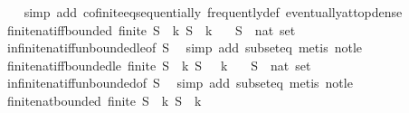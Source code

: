 \begin{isabellebody}
\ \ \isamarkupfalse%
\ {\isacharparenleft}simp\ add{\isacharcolon}\ cofinite{\isacharunderscore}eq{\isacharunderscore}sequentially\ frequently{\isacharunderscore}def\ eventually{\isacharunderscore}at{\isacharunderscore}top{\isacharunderscore}dense{\isacharparenright}%
\endisatagproof
{\isafoldproof}%
%
\isadelimproof
\isanewline
%
\endisadelimproof
\isanewline
{}\isamarkupfalse%
\ finite{\isacharunderscore}nat{\isacharunderscore}iff{\isacharunderscore}bounded{\isacharcolon}\ {\isachardoublequoteopen}finite\ S\ {\isasymlongleftrightarrow}\ {\isacharparenleft}{\isasymexists}k{\isachardot}\ S\ {\isasymsubseteq}\ {\isacharbraceleft}{\isachardot}{\isachardot}{\isacharless}k{\isacharbraceright}{\isacharparenright}{\isachardoublequoteclose}\isanewline
\ \ \ S\ {\isacharcolon}{\isacharcolon}\ {\isachardoublequoteopen}nat\ set{\isachardoublequoteclose}\isanewline
%
\isadelimproof
\ \ %
\endisadelimproof
%
\isatagproof
{}\isamarkupfalse%
\ infinite{\isacharunderscore}nat{\isacharunderscore}iff{\isacharunderscore}unbounded{\isacharunderscore}le{\isacharbrackleft}of\ S{\isacharbrackright}\ \isamarkupfalse%
\ {\isacharparenleft}simp\ add{\isacharcolon}\ subset{\isacharunderscore}eq{\isacharparenright}\ {\isacharparenleft}metis\ not{\isacharunderscore}le{\isacharparenright}%
\endisatagproof
{\isafoldproof}%
%
\isadelimproof
\isanewline
%
\endisadelimproof
\isanewline
{}\isamarkupfalse%
\ finite{\isacharunderscore}nat{\isacharunderscore}iff{\isacharunderscore}bounded{\isacharunderscore}le{\isacharcolon}\ {\isachardoublequoteopen}finite\ S\ {\isasymlongleftrightarrow}\ {\isacharparenleft}{\isasymexists}k{\isachardot}\ S\ {\isasymsubseteq}\ {\isacharbraceleft}{\isachardot}{\isachardot}\ k{\isacharbraceright}{\isacharparenright}{\isachardoublequoteclose}\isanewline
\ \ \ S\ {\isacharcolon}{\isacharcolon}\ {\isachardoublequoteopen}nat\ set{\isachardoublequoteclose}\isanewline
%
\isadelimproof
\ \ %
\endisadelimproof
%
\isatagproof
{}\isamarkupfalse%
\ infinite{\isacharunderscore}nat{\isacharunderscore}iff{\isacharunderscore}unbounded{\isacharbrackleft}of\ S{\isacharbrackright}\ \isamarkupfalse%
\ {\isacharparenleft}simp\ add{\isacharcolon}\ subset{\isacharunderscore}eq{\isacharparenright}\ {\isacharparenleft}metis\ not{\isacharunderscore}le{\isacharparenright}%
\endisatagproof
{\isafoldproof}%
%
\isadelimproof
\isanewline
%
\endisadelimproof
\isanewline
{}\isamarkupfalse%
\ finite{\isacharunderscore}nat{\isacharunderscore}bounded{\isacharcolon}\ {\isachardoublequoteopen}finite\ S\ {\isasymLongrightarrow}\ {\isasymexists}k{\isachardot}\ S\ {\isasymsubseteq}\ {\isacharbraceleft}{\isachardot}{\isachardot}{\isacharless}k{\isacharbraceright}{\isachardoublequoteclose}\isanewline

\end{isabellebody}
